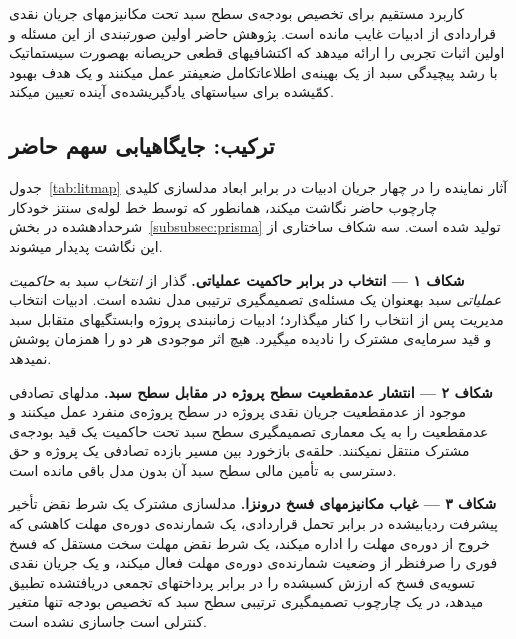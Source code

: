 کاربرد مستقیم  برای تخصیص بودجه‌ی سطح سبد
تحت مکانیزم\zwnj{}های جریان نقدی قراردادی
از ادبیات غایب مانده است.
پژوهش حاضر اولین صورت\zwnj{}بندی  از این مسئله
و اولین اثبات تجربی را ارائه می\zwnj{}دهد که اکتشافی\zwnj{}های قطعی حریصانه
به\zwnj{}صورت سیستماتیک با رشد پیچیدگی سبد از یک بهینه‌ی اطلاعات\zwnj{}کامل
ضعیف\zwnj{}تر عمل می\zwnj{}کنند و یک هدف بهبود کمّی\zwnj{}شده
برای سیاست\zwnj{}های یادگیری\zwnj{}شده‌ی آینده تعیین می\zwnj{}کند.

\subsection{ترکیب: جایگاه\zwnj{}یابی سهم حاضر}
\label{subsec:lr_synthesis}

جدول~\ref{tab:litmap} آثار نماینده را در چهار جریان ادبیات
در برابر ابعاد مدل\zwnj{}سازی کلیدی چارچوب حاضر نگاشت می\zwnj{}کند،
همان\zwnj{}طور که توسط خط لوله‌ی سنتز خودکار
شرح\zwnj{}داده\zwnj{}شده در بخش~\ref{subsubsec:prisma} تولید شده است.
سه شکاف ساختاری از این نگاشت پدیدار می\zwnj{}شوند.

\textbf{شکاف ۱ --- انتخاب در برابر حاکمیت عملیاتی.}\;
گذار از \emph{انتخاب} سبد به \emph{حاکمیت عملیاتی} سبد
به\zwnj{}عنوان یک مسئله‌ی تصمیم\zwnj{}گیری ترتیبی مدل نشده است.
ادبیات انتخاب مدیریت پس از انتخاب را کنار می\zwnj{}گذارد؛
ادبیات زمان\zwnj{}بندی پروژه وابستگی\zwnj{}های متقابل سبد
و قید سرمایه‌ی مشترک را نادیده می\zwnj{}گیرد.
هیچ اثر موجودی هر دو را همزمان پوشش نمی\zwnj{}دهد.

\textbf{شکاف ۲ --- انتشار عدم\zwnj{}قطعیت سطح پروژه در مقابل سطح سبد.}\;
مدل\zwnj{}های تصادفی موجود از عدم\zwnj{}قطعیت جریان نقدی پروژه
در سطح پروژه‌ی منفرد عمل می\zwnj{}کنند
و عدم\zwnj{}قطعیت را به یک معماری تصمیم\zwnj{}گیری سطح سبد
تحت حاکمیت یک قید بودجه‌ی مشترک منتقل نمی\zwnj{}کنند.
حلقه‌ی بازخورد بین مسیر بازده تصادفی یک پروژه
و حق دسترسی به تأمین مالی سطح سبد آن بدون مدل باقی مانده است.

\textbf{شکاف ۳ --- غیاب مکانیزم\zwnj{}های فسخ درون\zwnj{}زا.}\;
مدل\zwnj{}سازی مشترک یک شرط نقض تأخیر پیشرفت ردیابی\zwnj{}شده
در برابر تحمل قراردادی، یک شمارنده‌ی دوره‌ی مهلت کاهشی
که خروج از دوره‌ی مهلت را اداره می\zwnj{}کند،
یک شرط نقض مهلت سخت مستقل که فسخ فوری را
صرف\zwnj{}نظر از وضعیت شمارنده‌ی دوره‌ی مهلت فعال می\zwnj{}کند،
و یک جریان نقدی تسویه‌ی فسخ که ارزش کسب\zwnj{}شده را
در برابر پرداخت\zwnj{}های تجمعی دریافت\zwnj{}شده تطبیق می\zwnj{}دهد،
در یک چارچوب تصمیم\zwnj{}گیری ترتیبی سطح سبد
که تخصیص بودجه تنها متغیر کنترلی است جاسازی نشده است.

